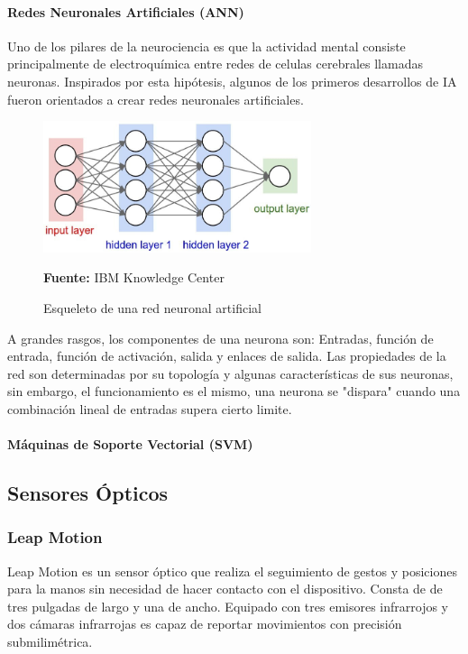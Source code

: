 \paragraph{Redes Neuronales Artificiales (ANN)}
Uno de los pilares de la neurociencia es que la actividad mental consiste principalmente de electroquímica entre redes de celulas cerebrales llamadas neuronas. Inspirados por esta hipótesis, algunos de los primeros desarrollos de IA fueron orientados a crear redes neuronales artificiales. \parencite[727]{Russel2010Artificial_Intelligence_3rd}

\begin{figure}[H]
    \centering
    \includegraphics[width=0.7\textwidth]{Anexos/LATEX/chapters/images/ann.jpg}
    \caption{Esqueleto de una red neuronal artificial}
    \small{\textbf{Fuente:} IBM Knowledge Center}
    \label{ann}
\end{figure}

A grandes rasgos, los componentes de una neurona son: Entradas, función de entrada, función de activación, salida y enlaces de salida. Las propiedades de la red son determinadas por su topología y algunas características de sus neuronas, sin embargo, el funcionamiento es el mismo, una neurona se "dispara" cuando una combinación lineal de entradas supera cierto limite.
\paragraph{Máquinas de Soporte Vectorial (SVM)}
\subsection{Sensores Ópticos}
\subsubsection{Leap Motion}
Leap Motion es un sensor óptico que realiza el seguimiento de gestos y posiciones para la manos sin necesidad de hacer contacto con el dispositivo. Consta de de tres pulgadas de largo y una de ancho. Equipado con tres emisores infrarrojos y dos cámaras infrarrojas es capaz de reportar movimientos con precisión submilimétrica. \parencite{Weichert2013AnalysisController.}

